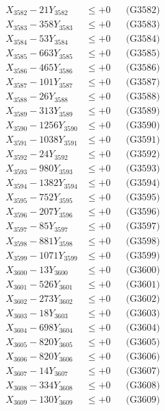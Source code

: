 \documentclass[a4paper,10pt]{article}
\begin{document}
{\begin{align}
X_{3582} - 21Y_{3582} &\leq +0 && \text{(G3582)} \\
X_{3583} - 358Y_{3583} &\leq +0 && \text{(G3583)} \\
X_{3584} - 53Y_{3584} &\leq +0 && \text{(G3584)} \\
X_{3585} - 663Y_{3585} &\leq +0 && \text{(G3585)} \\
X_{3586} - 465Y_{3586} &\leq +0 && \text{(G3586)} \\
X_{3587} - 101Y_{3587} &\leq +0 && \text{(G3587)} \\
X_{3588} - 26Y_{3588} &\leq +0 && \text{(G3588)} \\
X_{3589} - 313Y_{3589} &\leq +0 && \text{(G3589)} \\
X_{3590} - 1256Y_{3590} &\leq +0 && \text{(G3590)} \\
\allowbreak
X_{3591} - 1038Y_{3591} &\leq +0 && \text{(G3591)} \\
X_{3592} - 24Y_{3592} &\leq +0 && \text{(G3592)} \\
X_{3593} - 980Y_{3593} &\leq +0 && \text{(G3593)} \\
X_{3594} - 1382Y_{3594} &\leq +0 && \text{(G3594)} \\
X_{3595} - 752Y_{3595} &\leq +0 && \text{(G3595)} \\
X_{3596} - 207Y_{3596} &\leq +0 && \text{(G3596)} \\
X_{3597} - 85Y_{3597} &\leq +0 && \text{(G3597)} \\
X_{3598} - 881Y_{3598} &\leq +0 && \text{(G3598)} \\
X_{3599} - 1071Y_{3599} &\leq +0 && \text{(G3599)} \\
X_{3600} - 13Y_{3600} &\leq +0 && \text{(G3600)} \\
\allowbreak
X_{3601} - 526Y_{3601} &\leq +0 && \text{(G3601)} \\
X_{3602} - 273Y_{3602} &\leq +0 && \text{(G3602)} \\
X_{3603} - 18Y_{3603} &\leq +0 && \text{(G3603)} \\
X_{3604} - 698Y_{3604} &\leq +0 && \text{(G3604)} \\
X_{3605} - 820Y_{3605} &\leq +0 && \text{(G3605)} \\
X_{3606} - 820Y_{3606} &\leq +0 && \text{(G3606)} \\
X_{3607} - 14Y_{3607} &\leq +0 && \text{(G3607)} \\
X_{3608} - 334Y_{3608} &\leq +0 && \text{(G3608)} \\
X_{3609} - 130Y_{3609} &\leq +0 && \text{(G3609)} \\

\end{align}}
\end{document}
